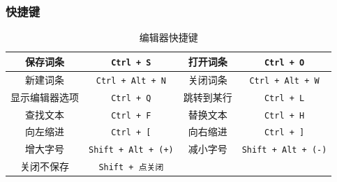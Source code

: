 \subsubsection{快捷键}

\begin{table}[ht]
\centering
\caption{编辑器快捷键}\label{editor_tab1}
\begin{tabular}{|c|c|c|c|}
\hline
保存词条 & \lstinline|Ctrl + S| & 打开词条 & \lstinline|Ctrl + O| \\
\hline
新建词条 & \lstinline|Ctrl + Alt + N| & 关闭词条 & \lstinline|Ctrl + Alt + W| \\
\hline
显示编辑器选项 & \lstinline|Ctrl + Q| & 跳转到某行 & \lstinline|Ctrl + L| \\
\hline
查找文本 & \lstinline|Ctrl + F| & 替换文本 & \lstinline|Ctrl + H| \\
\hline
向左缩进 & \lstinline|Ctrl + [| & 向右缩进 & \lstinline|Ctrl + ]| \\
\hline
增大字号 & \lstinline|Shift + Alt + (+)| & 减小字号 & \lstinline|Shift + Alt + (-)| \\
\hline
关闭不保存 & \lstinline|Shift + 点关闭| &  &  \\
\hline
\end{tabular}
\end{table}
